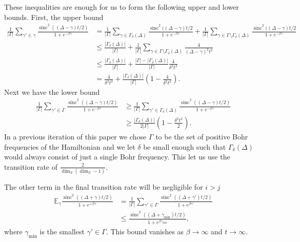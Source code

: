 \documentclass[
 amsmath,amssymb,
 aps,
onecolumn, 
nofootinbib]{revtex4-2}
\newcommand{\abs}[1]{\left| #1 \right|}
\newcommand{\EE}{\mathbb{E}}
\DeclareMathOperator{\sinc}{sinc}
\begin{document}
These inequalities are enough for us to form the following upper and lower bounds. First, the upper bound
\begin{align}
    \frac{1}{|\Gamma|}\sum_{\gamma' \in \gamma} \frac{\sinc^2((\Delta - \gamma) t/ 2)}{1 + e^{-\beta \gamma}} &= \frac{1}{|\Gamma|}\sum_{\gamma \in \Gamma_\delta(\Delta)} \frac{\sinc^2((\Delta - \gamma)t/2}{1 + e^{-\beta \gamma}} + \frac{1}{|\Gamma|} \sum_{\gamma \in \Gamma \setminus \Gamma_\delta(\Delta)} \frac{\sinc^2((\Delta - \gamma)t/2}{1 + e^{-\beta \gamma}} \\
    &\le \frac{|\Gamma_\delta(\Delta)|}{|\Gamma|} + \frac{1}{|\Gamma|} \sum_{\gamma \in \Gamma \setminus \Gamma_\delta(\Delta)} \frac{4}{(\Delta - \gamma)^2 t^2} \\
    &\le \frac{\abs{\Gamma_\delta(\Delta)}}{\abs{\Gamma}} + \frac{|\Gamma| - |\Gamma_\delta(\Delta)|}{|\Gamma|} \frac{4}{\delta^2 t^2} \\
    &= \frac{4}{\delta^2 t^2} + \frac{\abs{\Gamma_\delta(\Delta)}}{\abs{\Gamma}} \left( 1 - \frac{4}{\delta^2 t^2} \right).
\end{align}
Next we have the lower bound
\begin{align}
    \frac{1}{|\Gamma|} \sum_{\gamma' \in \Gamma} \frac{\sinc^2((\Delta - \gamma)t/2)}{1 + e^{-\beta \gamma}} &\ge \frac{1}{|\Gamma|} \sum_{\gamma' \in \Gamma_\delta(\Delta)} \frac{\sinc^2((\Delta - \gamma)t/2)}{1 + e^{-\beta \gamma}} \\
    &\ge \frac{|\Gamma_\delta(\Delta)|}{2|\Gamma|} \left(1 - \frac{\delta^2 t^2}{2}\right).
\end{align}
In a previous iteration of this paper we chose $\Gamma$ to be the set of positive Bohr frequencies of the Hamiltonian and we let $\delta$ be small enough such that $\Gamma_\delta(\Delta)$ would always consist of just a single Bohr frequency. This let us use the transition rate of $\frac{2}{\dim_S(\dim_S - 1)}$. 

The other term in the final transition rate will be negligible for $i > j$
\begin{align}
    \EE_\gamma \frac{\sinc^2((\Delta + \gamma) t/2)}{1 + e^{+\beta \gamma}} &= \frac{1}{|\Gamma|}\sum_{\gamma' \in \Gamma} \frac{\sinc^2((\Delta + \gamma')t/2)}{1 + e^{\beta \gamma'}} \\
    &\le \frac{\sinc^2((\Delta + \gamma_{\min})t/2)}{1+e^{\beta \gamma_{\min}}},
\end{align}
where $\gamma_{\min}$ is the smallest $\gamma' \in \Gamma$. This bound vanishes as $\beta \to \infty$ and $t \to \infty$. 
\end{document}
